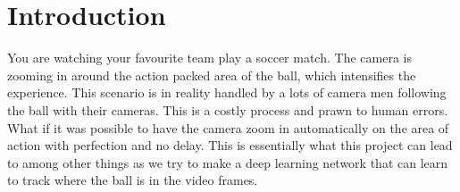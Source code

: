
\section{Introduction}
You are watching your favourite team play a soccer match. The camera is zooming in around the action packed area of the ball, which intensifies the experience.
This scenario is in reality handled by a lots of camera men following the ball with their cameras. This is a costly process and prawn to human errors. What if it was possible to have the camera zoom in automatically on the area of action with perfection and no delay. This is essentially what this project can lead to among other things as we try to make a deep learning network that can learn to track where the ball is in the video frames.
